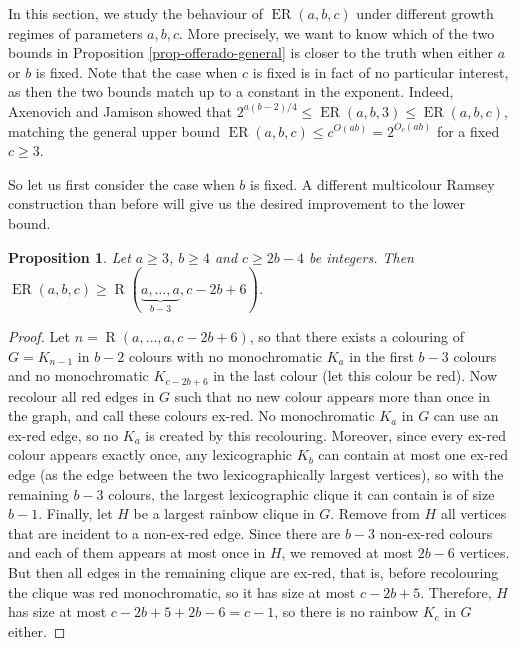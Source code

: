 \documentclass[11pt]{article}
\theoremstyle{plain}
\newtheorem{proposition}[theorem]{Proposition}
\theoremstyle{definition}
\newcommand{\offerado}[3]{\operatorname{ER}(#1,#2,#3)}
\begin{document}
In this section, we study the behaviour of $\offerado{a}{b}{c}$ under different growth regimes of parameters $a,b,c$. More precisely, we want to know which of the two bounds in Proposition \ref{prop-offerado-general} is closer to the truth when either $a$ or $b$ is fixed. Note that the case when $c$ is fixed is in fact of no particular interest, as then the two bounds match up to a constant in the exponent. Indeed, Axenovich and Jamison \cite{axenovich2005canonical} showed that $2^{a(b-2)/4}\le \offerado{a}{b}{3}\le \offerado{a}{b}{c}$, matching the general upper bound $\offerado{a}{b}{c}\le c^{O(ab)}=2^{O_c(ab)}$ for a fixed $c\ge 3$.

So let us first consider the case when $b$ is fixed. A different multicolour Ramsey construction than before will give us the desired improvement to the lower bound.

\begin{proposition}\label{prop-lower-offerado-multiram}
    Let $a\ge3$, $b\ge 4$ and $c\ge 2b-4$ be integers. Then $\offerado abc\ge \operatorname{R}(\underbrace{a,\dots,a}_{b-3},c-2b+6)$.
\end{proposition}

\begin{proof}
    Let $n = \operatorname{R}(a,\dots,a,c-2b+6)$, so that there exists a colouring of $G=K_{n-1}$ in $b-2$ colours with no monochromatic $K_a$ in the first $b-3$ colours and no monochromatic $K_{c-2b+6}$ in the last colour (let this colour be red). Now recolour all red edges in $G$ such that no new colour appears more than once in the graph, and call these colours ex-red. No monochromatic $K_a$ in $G$ can use an ex-red edge, so no $K_a$ is created by this recolouring. Moreover, since every ex-red colour appears exactly once, any lexicographic $K_b$ can contain at most one ex-red edge (as the edge between the two lexicographically largest vertices), so with the remaining $b-3$ colours, the largest lexicographic clique it can contain is of size $b-1$. Finally, let $H$ be a largest rainbow clique in $G$. Remove from $H$ all vertices that are incident to a non-ex-red edge. Since there are $b-3$ non-ex-red colours and each of them appears at most once in $H$, we removed at most $2b-6$ vertices. But then all edges in the remaining clique are ex-red, that is, before recolouring the clique was red monochromatic, so it has size at most $c-2b+5$. Therefore, $H$ has size at most $c-2b+5+2b-6=c-1$, so there is no rainbow $K_c$ in $G$ either. 
\end{proof}
\end{document}
